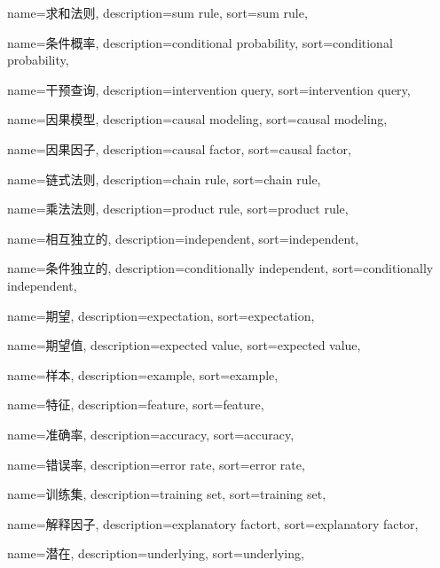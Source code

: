 {
  name=求和法则,
  description={sum rule},
  sort={sum rule},
}

{
  name=条件概率,
  description={conditional probability},
  sort={conditional probability},
}

{
  name=干预查询,
  description={intervention query},
  sort={intervention query},
}

{
  name=因果模型,
  description={causal modeling},
  sort={causal modeling},
}

{
	name=因果因子,
	description={causal factor},
	sort={causal factor},
}

{
  name=链式法则,
  description={chain rule},
  sort={chain rule},
}

{
  name=乘法法则,
  description={product rule},
  sort={product rule},
}

{
  name=相互独立的,
  description={independent},
  sort={independent},
}

{
  name=条件独立的,
  description={conditionally independent},
  sort={conditionally independent},
}

{
  name=期望,
  description={expectation},
  sort={expectation},
}

{
  name=期望值,
  description={expected value},
  sort={expected value},
}

{
  name=样本,
  description={example},
  sort={example},
}

{
  name=特征,
  description={feature},
  sort={feature},
}

{
  name=准确率,
  description={accuracy},
  sort={accuracy},
}

{
  name=错误率,
  description={error rate},
  sort={error rate},
}

{
  name=训练集,
  description={training set},
  sort={training set},
}


{
	name=解释因子,
	description={explanatory factort},
	sort={explanatory factor},
}

{
	name=潜在,
	description={underlying},
	sort={underlying},
}

